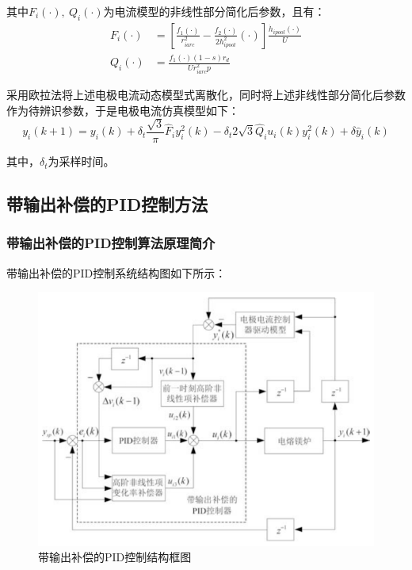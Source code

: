 \documentclass[UTF8, 12pt]{article}
\begin{document}
其中$F_i(\cdot),\ Q_i(\cdot)$为电流模型的非线性部分简化后参数，且有：
\begin{align*}
	F_i(\cdot) &= [\frac{f_1(\cdot)}{r_{iarc}^2} - \frac{f_2(\cdot)}{2h_{ipool}^2}(\cdot)] \frac{\dot{h}_{ipool}(\cdot)}{U} \\
	Q_i(\cdot) &= \frac{f_1(\cdot)(1-s)r_d}{Ur_{iarc}^2p} 
\end{align*}

采用欧拉法将上述电极电流动态模型式离散化，同时将上述非线性部分简化后参数作为待辨识参数，于是电极电流仿真模型如下：
\begin{equation*}
	y_i(k+1) = y_i(k) + \delta_t \frac{\sqrt{3}}{\pi}\hat{F}_iy_i^2(k) - \delta_t2\sqrt{3}\hat{Q}_iu_i(k)y_i^2(k) + \delta \hat{y}_i(k)
\end{equation*}

其中，$\delta_t$为采样时间。

\subsection{带输出补偿的PID控制方法}
\subsubsection{带输出补偿的PID控制算法原理简介}
带输出补偿的PID控制系统结构图如下所示：
\begin{figure}[H]
    \centering %
    \includegraphics[width=.8\textwidth]{figure/带输出补偿的PID控制结构框图.png} 
    \caption{带输出补偿的PID控制结构框图} %
\end{figure}

\end{document}
